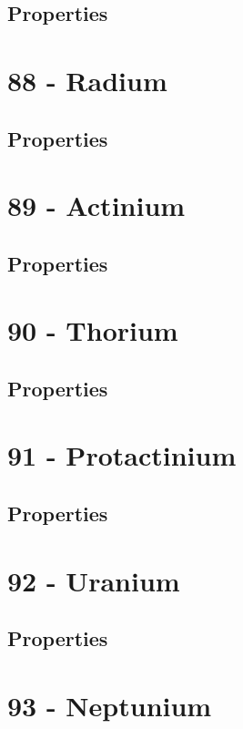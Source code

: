 \documentclass{book}
\begin{document}
\subsection{Properties}

\section{88 - Radium}
\label{sec:elem-radium}
\subsection{Properties}

\section{89 - Actinium}
\label{sec:elem-actinium}
\subsection{Properties}

\section{90 - Thorium}
\label{sec:elem-thorium}
\subsection{Properties}

\section{91 - Protactinium}
\label{sec:elem-protactinium}
\subsection{Properties}

\section{92 - Uranium}
\label{sec:elem-uranium}
\subsection{Properties}

\section{93 - Neptunium}
\label{sec:elem-neptunium}
\end{document}
